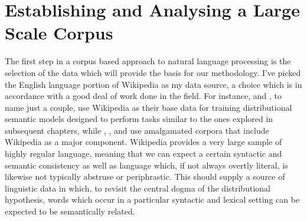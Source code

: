 \section{Establishing and Analysing a Large Scale Corpus} \label{sec:pmi}
The first step in a corpus based approach to natural language processing is the selection of the data which will provide the basis for our methodology.  I've picked the English language portion of Wikipedia as my data source, a choice which is in accordance with a good deal of work done in the field.  For instance, \cite{GabrilovichEA2007} and \cite{CollobertEA2008}, to name just a couple, use Wikipedia as their base data for training distributional semantic models designed to perform tasks similar to the ones explored in subsequent chapters, while \cite{BaroniEA2014}, \cite{PenningtonEA2014}, and \cite{GutierrezEA2016} use amalgamated corpora that include Wikipedia as a major component.  Wikipedia provides a very large sample of highly regular language, meaning that we can expect a certain syntactic and semantic consistency as well as language which, if not always overtly literal, is likewise not typically abstruse or periphrastic.  This should supply a source of linguistic data in which, to revisit the central dogma of the distributional hypothesis, words which occur in a particular syntactic and lexical setting can be expected to be semantically related.

